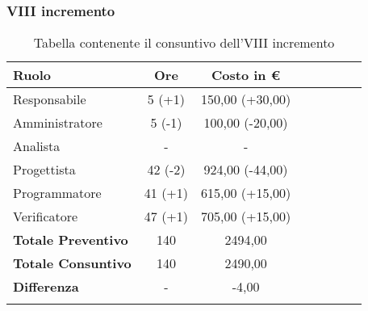 \subsubsection{VIII incremento}\label{_consuntivoTerm1}
\begin{longtable}{|l|c|c|c|c|c|c|c|}
	\hline
	\rowcolor{lighter-grayer}
	\textbf{Ruolo}             & \textbf{Ore} & \textbf{Costo in €} \\
	\hline
	\endfirsthead

	\hline
	Responsabile               & 5 (+1)        & 150,00 (+30,00) \\
	\hline
	\hline
	Amministratore             & 5 (-1)       & 100,00 (-20,00)     \\
	\hline
	\hline
	Analista                   & -       & -   \\
	\hline
	\hline
	Progettista                & 42 (-2)            & 924,00 (-44,00)              \\
	\hline
	\hline
	Programmatore              & 41 (+1)            & 615,00 (+15,00)                   \\
	\hline
	\hline
	Verificatore               & 47 (+1)       & 705,00 (+15,00)    \\
	\hline
	\textbf{Totale Preventivo} & 140          & 2494,00           \\
	\hline
	\hline
	\textbf{Totale Consuntivo} & 140          & 2490,00            \\
	\hline
	\hline
	\textbf{Differenza}        & -           & -4,00           \\
	\hline
	\rowcolor{white}
	\caption{Tabella contenente il consuntivo dell'VIII incremento}
\end{longtable}

